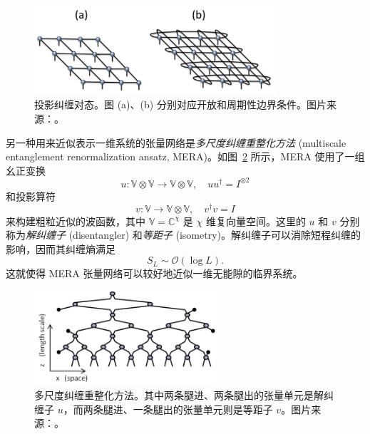 \begin{figure}[htb]
  \centering
  \includegraphics[width=0.8\textwidth]{images/tensor-network/peps.pdf}
  \caption[投影纠缠对态]{投影纠缠对态。图 (a)、(b) 分别对应开放和周期性边界条件。图片来源：\parencite{orus2014practical}。}
  \label{fig:peps}
\end{figure}

另一种用来近似表示一维系统的张量网络是\emph{多尺度纠缠重整化方法} (multiscale entanglement renormalization ansatz, MERA)\cite{vidal2007entanglement,evenbly2009algorithms,konig2009exact,evenbly2014algorithms,evenbly2015tensor2}。如图~\ref{fig:mera} 所示，MERA 使用了一组幺正变换
\begin{equation}
  u \colon \mathbb{V} \otimes \mathbb{V} \to \mathbb{V} \otimes \mathbb{V}, \quad
  u u^\dagger = I^{\otimes2}
\end{equation}
和投影算符
\begin{equation}
  v \colon \mathbb{V} \to \mathbb{V} \otimes \mathbb{V}, \quad
  v^\dagger v = I
\end{equation}
来构建粗粒近似的波函数，其中 $\mathbb{V}=\mathbb{C}^\chi$ 是 $\chi$ 维复向量空间。这里的 $u$ 和 $v$ 分别称为\emph{解纠缠子} (disentangler) 和\emph{等距子} (isometry)。解纠缠子可以消除短程纠缠的影响，因而其纠缠熵满足
\begin{equation}
  S_L \sim \mathcal{O}(\log L).
\end{equation}
这就使得 MERA 张量网络可以较好地近似一维无能隙的临界系统。

\begin{figure}[htb]
  \centering
  \includegraphics[width=0.6\textwidth]{images/tensor-network/mera.pdf}
  \caption[多尺度纠缠重整化方法]{多尺度纠缠重整化方法。其中两条腿进、两条腿出的张量单元是解纠缠子 $u$，而两条腿进、一条腿出的张量单元则是等距子 $v$。图片来源：\parencite{evenbly2011tensor}。}
  \label{fig:mera}
\end{figure}

